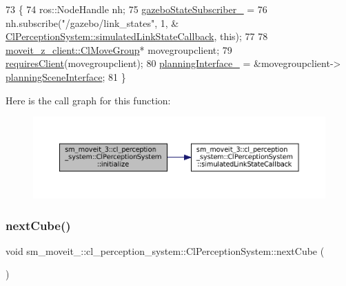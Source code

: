 \begin{DoxyCode}
73   \{
74     ros::NodeHandle nh;
75     \hyperlink{classsm__moveit__3_1_1cl__perception__system_1_1ClPerceptionSystem_a66371d7b71709d9286e63ee92f6507c5}{gazeboStateSubscriber\_} =
76         nh.subscribe(\textcolor{stringliteral}{"/gazebo/link\_states"}, 1, &
      \hyperlink{classsm__moveit__3_1_1cl__perception__system_1_1ClPerceptionSystem_a540c3a50c29e6ec58f6fcd7e993d9dff}{ClPerceptionSystem::simulatedLinkStateCallback}, \textcolor{keyword}{this});
77     
78     \hyperlink{classmoveit__z__client_1_1ClMoveGroup}{moveit\_z\_client::ClMoveGroup}* movegroupclient;
79     \hyperlink{classsmacc_1_1ISmaccClient_a7a9990a2f3e35d547671188d69fee520}{requiresClient}(movegroupclient);
80     \hyperlink{classsm__moveit__3_1_1cl__perception__system_1_1ClPerceptionSystem_aa59191e3993ffbfc8e8332f76d727259}{planningInterface\_} = &movegroupclient->
      \hyperlink{classmoveit__z__client_1_1ClMoveGroup_a21c879b2683286aa21ce68f40195b4b5}{planningSceneInterface};
81   \}
\end{DoxyCode}
Here is the call graph for this function\+:
\nopagebreak
\begin{figure}[H]
\begin{center}
\leavevmode
\includegraphics[width=350pt]{classsm__moveit__3_1_1cl__perception__system_1_1ClPerceptionSystem_a852bf07fda7da87e7bb4ad9336e25042_cgraph}
\end{center}
\end{figure}
\mbox{\label{classsm__moveit__3_1_1cl__perception__system_1_1ClPerceptionSystem_a35d80131bec4a63ab939667865e7d08d}} 
\subsubsection{\texorpdfstring{next\+Cube()}{nextCube()}}
{\footnotesize\ttfamily void sm\+\_\+moveit\+\_\+::cl\+\_\+perception\+\_\+system\+::\+Cl\+Perception\+System\+::next\+Cube (\begin{DoxyParamCaption}{ }\end{DoxyParamCaption})\hspace{0.3cm}{\ttfamily [inline]}}



